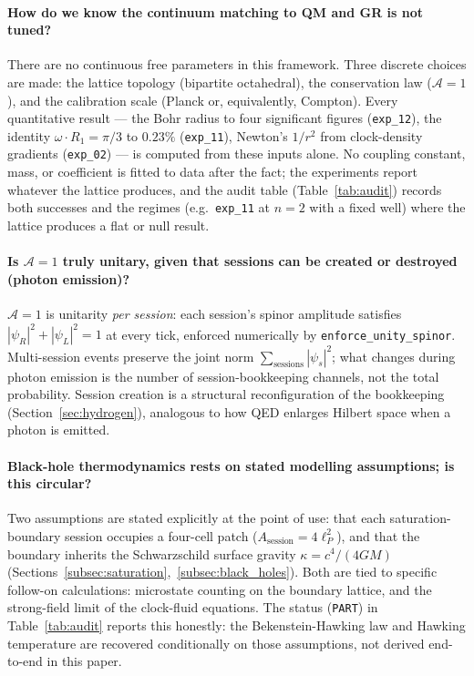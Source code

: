 \paragraph{How do we know the continuum matching to QM and GR is not
tuned?}
There are no continuous free parameters in this framework.
Three discrete choices are made: the lattice topology (bipartite
octahedral), the conservation law ($\mathcal{A}=1$), and the
calibration scale (Planck or, equivalently, Compton).
Every quantitative result --- the Bohr radius to four significant
figures (\texttt{exp\_12}), the identity $\omega \cdot R_1 = \pi/3$ to
$0.23\%$ (\texttt{exp\_11}), Newton's $1/r^2$ from clock-density
gradients (\texttt{exp\_02}) --- is computed from these inputs alone.
No coupling constant, mass, or coefficient is fitted to data after
the fact; the experiments report whatever the lattice produces, and
the audit table (Table~\ref{tab:audit}) records both successes and
the regimes (e.g.\ \texttt{exp\_11} at $n=2$ with a fixed well) where
the lattice produces a flat or null result.

\paragraph{Is $\mathcal{A}=1$ truly unitary, given that sessions can
be created or destroyed (photon emission)?}
$\mathcal{A}=1$ is unitarity \emph{per session}: each session's
spinor amplitude satisfies $|\psi_R|^2 + |\psi_L|^2 = 1$ at every
tick, enforced numerically by \texttt{enforce\_unity\_spinor}.
Multi-session events preserve the joint norm
$\sum_\text{sessions} |\psi_s|^2$; what changes during photon
emission is the number of session-bookkeeping channels, not the
total probability.
Session creation is a structural reconfiguration of the bookkeeping
(Section~\ref{sec:hydrogen}), analogous to how QED enlarges Hilbert
space when a photon is emitted.

\paragraph{Black-hole thermodynamics rests on stated modelling
assumptions; is this circular?}
Two assumptions are stated explicitly at the point of use: that each
saturation-boundary session occupies a four-cell patch
($A_\text{session} = 4\ell_P^2$), and that the boundary inherits the
Schwarzschild surface gravity $\kappa = c^4/(4GM)$
(Sections~\ref{subsec:saturation},~\ref{subsec:black_holes}).
Both are tied to specific follow-on calculations: microstate
counting on the boundary lattice, and the strong-field limit of the
clock-fluid equations.
The status (\texttt{PART}) in Table~\ref{tab:audit} reports this
honestly: the Bekenstein-Hawking law and Hawking temperature are
recovered conditionally on those assumptions, not derived end-to-end
in this paper.

